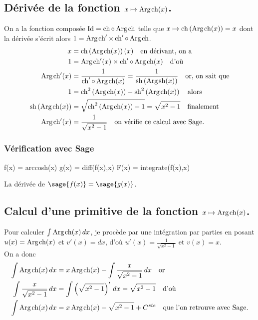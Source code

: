 \documentclass[a4paper,12pt]{report}
\def\Id{\ensuremath{\mathrm{Id}}}
\renewcommand{\sinh}{\mathop{\mathrm{sh}}}
\renewcommand{\cosh}{\mathop{\mathrm{ch}}}
\renewcommand{\arg}{\mathop{\mathrm{Arg}}}
\begin{document}
\subsection{Dérivée de la fonction $x \mapsto \arg\mspace{-1mu}\cosh(x)$.}
On a la fonction composée $\Id = \cosh \circ \arg\mspace{-1mu}\cosh$ telle que $x\mapsto\cosh\left(\arg\mspace{-1mu}\cosh(x)\right)=x$ dont la dérivée s'écrit alors $1= \arg\mspace{-1mu}\cosh\nolimits' \times \cosh\nolimits'\circ\arg\mspace{-1mu}\cosh$.
\begin{align*}
x & =\cosh\left(\arg\mspace{-1mu}\cosh(x)\right)(x) \quad \textrm{en dérivant, on a}\\
1 & = \arg\mspace{-1mu}\cosh\nolimits'(x) \times \cosh\nolimits'\circ\arg\mspace{-1mu}\cosh(x) \quad \textrm{d'où}\\
\arg\mspace{-1mu}\cosh\nolimits'(x) & =\frac{1}{ \cosh\nolimits'\circ\arg\mspace{-1mu}\cosh(x)}=\frac{1}{ \sinh\left(\arg\mspace{-1mu}\sinh(x)\right)}\quad \textrm{or, on sait que}\\
1 & = \cosh\nolimits^2\left(\arg\mspace{-1mu}\cosh(x)\right) - \sinh\nolimits^2\left(\arg\mspace{-1mu}\cosh(x)\right) \quad \textrm{alors}\\
\sinh\left(\arg\mspace{-1mu}\cosh(x)\right) & = \sqrt{\cosh\nolimits^2\left(\arg\mspace{-1mu}\cosh(x)\right)-1}=\sqrt{x^2-1}\quad \textrm{finalement}\\
\arg\mspace{-1mu}\cosh\nolimits'(x) & = \frac{1}{ \sqrt{x^2-1}}\quad \textrm{on vérifie ce calcul avec Sage.}
\end{align*}


\subsubsection{Vérification avec Sage}


\begin{sageblock}
    f(x) = arccosh(x)
    g(x) = diff(f(x),x)
    F(x) = integrate(f(x),x)
\end{sageblock}

La dérivée de $\sage{f(x)} = \sage{g(x)} $.


\subsection{Calcul d'une primitive de la fonction  $x \mapsto \arg\mspace{-1mu}\cosh(x)$.}

Pour calculer $\int \arg\mspace{-1mu}\cosh(x) \, dx$, je procède par une intégration par parties en posant $u(x) = \arg\mspace{-1mu}\cosh(x)$ et $v'(x) = dx$, d'où $u'(x) = \frac{1}{ \sqrt{x^2-1}}$ et $ v(x) = x $. \\
On a donc
\begin{align*}
\int \arg\mspace{-1mu}\cosh(x) \, dx & = x \arg\mspace{-1mu}\cosh(x) - \int \frac{x}{ \sqrt{x^2-1}} \, dx \quad \textrm{or}\\
\int \frac{x}{ \sqrt{x^2-1}} \, dx & = \int \left(\sqrt{x^2-1}\right)' \, dx = \sqrt{x^2-1}  \quad \textrm{d'où}\\
\int \arg\mspace{-1mu}\cosh(x) \, dx & = x \arg\mspace{-1mu}\cosh(x) - \sqrt{x^2-1} + C^{ste} \quad \textrm{que l'on retrouve avec Sage.}
\end{align*}
\end{document}
